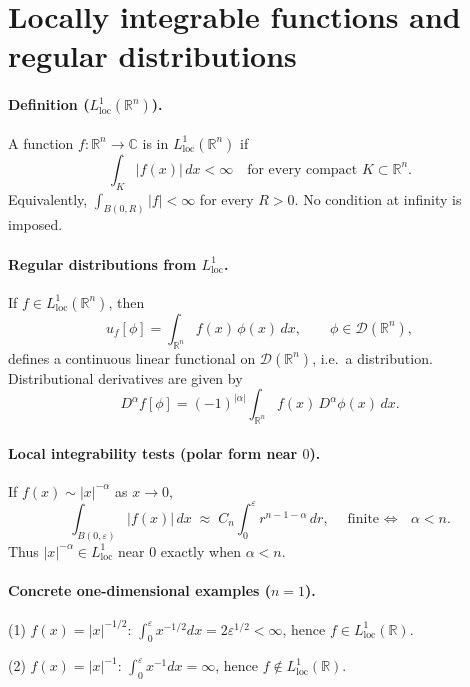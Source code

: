 \documentclass[12pt,a4paper]{article}
\theoremstyle{plain}
\theoremstyle{definition}
\theoremstyle{remark}
\theoremstyle{remark}
\begin{document}
\section*{Locally integrable functions and regular distributions}

\paragraph{Definition ($L^1_{\mathrm{loc}}(\mathbb R^n)$).}
A function $f:\mathbb R^n\to\mathbb C$ is in $L^1_{\mathrm{loc}}(\mathbb R^n)$ if
\[
\int_K |f(x)|\,dx<\infty \quad \text{for every compact } K\subset\mathbb R^n .
\]
Equivalently, $\int_{B(0,R)} |f|<\infty$ for every $R>0$. No condition at infinity is imposed.

\bigskip

\paragraph{Regular distributions from $L^1_{\mathrm{loc}}$.}
If $f\in L^1_{\mathrm{loc}}(\mathbb R^n)$, then
\[
u_f[\phi]=\int_{\mathbb R^n} f(x)\,\phi(x)\,dx ,\qquad \phi\in\mathcal D(\mathbb R^n),
\]
defines a continuous linear functional on $\mathcal D(\mathbb R^n)$, i.e.\ a distribution.
Distributional derivatives are given by
\[
D^\alpha f[\phi]=(-1)^{|\alpha|}\int_{\mathbb R^n} f(x)\,D^\alpha\phi(x)\,dx .
\]

\bigskip

\paragraph{Local integrability tests (polar form near $0$).}
If $f(x)\sim |x|^{-\alpha}$ as $x\to 0$,
\[
\int_{B(0,\varepsilon)} |f(x)|\,dx \;\approx\; C_n\!\int_0^\varepsilon r^{n-1-\alpha}\,dr,
\quad\text{finite $\iff$ } \alpha<n .
\]
Thus $|x|^{-\alpha}\in L^1_{\mathrm{loc}}$ near $0$ exactly when $\alpha<n$.

\bigskip

\paragraph{Concrete one-dimensional examples ($n=1$).}
(1) $f(x)=|x|^{-1/2}$: $\displaystyle \int_0^\varepsilon x^{-1/2}dx=2\varepsilon^{1/2}<\infty$, hence $f\in L^1_{\mathrm{loc}}(\mathbb R)$.
\medskip

(2) $f(x)=|x|^{-1}$: $\displaystyle \int_0^\varepsilon x^{-1}dx=\infty$, hence $f\notin L^1_{\mathrm{loc}}(\mathbb R)$.
\medskip
\end{document}
